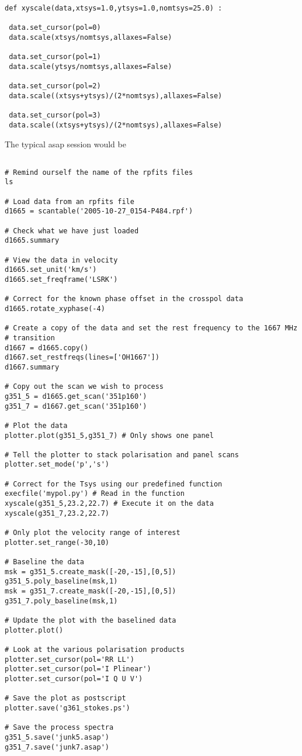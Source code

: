\documentclass[11pt]{article}
\begin{document}
\begin{verbatim}
def xyscale(data,xtsys=1.0,ytsys=1.0,nomtsys=25.0) :

 data.set_cursor(pol=0)
 data.scale(xtsys/nomtsys,allaxes=False)

 data.set_cursor(pol=1)
 data.scale(ytsys/nomtsys,allaxes=False)

 data.set_cursor(pol=2)
 data.scale((xtsys+ytsys)/(2*nomtsys),allaxes=False)

 data.set_cursor(pol=3)
 data.scale((xtsys+ytsys)/(2*nomtsys),allaxes=False)
\end{verbatim}

The typical asap session would be

\begin{verbatim}

# Remind ourself the name of the rpfits files
ls

# Load data from an rpfits file
d1665 = scantable('2005-10-27_0154-P484.rpf')

# Check what we have just loaded
d1665.summary

# View the data in velocity
d1665.set_unit('km/s')
d1665.set_freqframe('LSRK')

# Correct for the known phase offset in the crosspol data
d1665.rotate_xyphase(-4)

# Create a copy of the data and set the rest frequency to the 1667 MHz
# transition
d1667 = d1665.copy()
d1667.set_restfreqs(lines=['OH1667'])
d1667.summary

# Copy out the scan we wish to process
g351_5 = d1665.get_scan('351p160')
g351_7 = d1667.get_scan('351p160')

# Plot the data
plotter.plot(g351_5,g351_7) # Only shows one panel

# Tell the plotter to stack polarisation and panel scans
plotter.set_mode('p','s')

# Correct for the Tsys using our predefined function
execfile('mypol.py') # Read in the function
xyscale(g351_5,23.2,22.7) # Execute it on the data
xyscale(g351_7,23.2,22.7)

# Only plot the velocity range of interest
plotter.set_range(-30,10)

# Baseline the data
msk = g351_5.create_mask([-20,-15],[0,5])
g351_5.poly_baseline(msk,1)
msk = g351_7.create_mask([-20,-15],[0,5])
g351_7.poly_baseline(msk,1)

# Update the plot with the baselined data
plotter.plot()

# Look at the various polarisation products
plotter.set_cursor(pol='RR LL')
plotter.set_cursor(pol='I Plinear')
plotter.set_cursor(pol='I Q U V')

# Save the plot as postscript
plotter.save('g361_stokes.ps')

# Save the process spectra
g351_5.save('junk5.asap')
g351_7.save('junk7.asap')

\end{verbatim}
\end{document}
